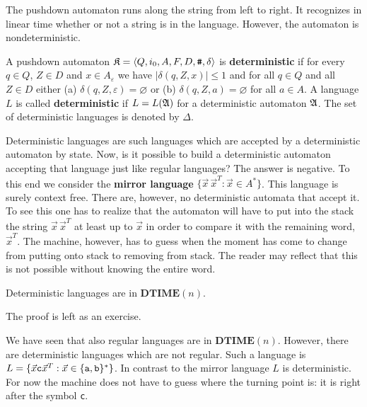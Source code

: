 The pushdown automaton runs along the string from left to right.
It recognizes in linear time whether or not a string is in the
language. However, the automaton is nondeterministic. 
\begin{defn}
A pushdown automaton $\GK = \auf Q, i_0, A, F, D, \mbox{\tt \#}, %
\delta\zu$ is \textbf{deterministic} if for every $q \in Q$, $Z \in D$ 
and $x \in A_{\varepsilon}$ we have $|\delta(q, Z, x)| \leq 1$ and 
for all $q \in Q$ and all $Z \in D$
either (a) $\delta(q,Z,\varepsilon) = \varnothing$ or
(b) $\delta(q,Z,a) = \varnothing$ for all $a \in A$.
A language $L$ is called \textbf{deterministic} if
$L = L(\mathfrak{A})$ for a deterministic automaton $\mathfrak{A}$.
\index{$\Delta$}%
The set of deterministic languages is denoted by $\Delta$.
\end{defn}
Deterministic languages are such languages which are accepted
by a deterministic automaton by state. Now, is it possible to
build a deterministic automaton accepting that language just
like regular languages? The answer is negative. To this end we
consider the \textbf{mirror language} $\{\vec{x}\, \vec{x}^T :
\vec{x} \in A^{\ast}\}$.
This language is surely context free. There are, however, no
deterministic automata that accept it. To see this one has to
realize that the automaton will have to put into the stack the
string $\vec{x} \, \vec{x}^T$ at least up to $\vec{x}$ in order
to compare it with the remaining word, $\vec{x}^T$. The machine,
however, has to guess when the moment has come to change from
putting onto stack to removing from stack. The reader may reflect
that this is not possible without knowing the entire word.
\begin{thm}
\label{thm:dtime}
Deterministic languages are in $\textbf{DTIME}(n)$.
\end{thm}
The proof is left as an exercise.

We have seen that also regular languages are in
$\mathbf{DTIME}(n)$. However, there are deterministic languages
which are not regular. Such a language is
$L = \{\vec{x}\mbox{\tt c}\vec{x}^T : \vec{x} \in \{\mbox{\tt a},
\mbox{\tt b}\}^{\ast}\}$. In contrast to the mirror language $L$
is deterministic. For now the machine does not have to guess
where the turning point is: it is right after the symbol
{\tt c}.

